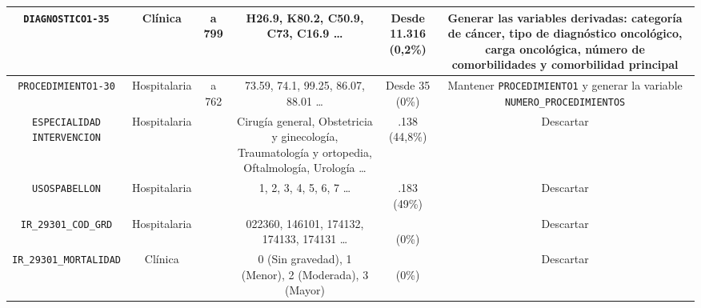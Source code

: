 \begin{table}[htbp]
\begin{tabular}{|c|c|c|c|c|c|}
\parbox[t]{2.6cm}{\raggedright \texttt{DIAGNOSTICO1-35}} &
\parbox[t]{1.5cm}{\centering Clínica} &
\parbox[t]{1cm}{ a 799} &
\parbox[t]{4.4cm}{\raggedright H26.9, K80.2, C50.9, C73, C16.9 \ldots} &
\parbox[t]{1.4cm}{\centering Desde 11.316\\(0,2\%)} &
\parbox[t]{3cm}{\raggedright Generar las variables derivadas: categoría de cáncer, tipo de diagnóstico oncológico, carga oncológica, número de comorbilidades y comorbilidad principal} \\ \hline

\parbox[t]{2.6cm}{\raggedright \texttt{PROCEDIMIENTO1-30}} &
\parbox[t]{1.5cm}{\centering Hospitalaria} &
\parbox[t]{1cm}{ a 762} &
\parbox[t]{4.4cm}{\raggedright 73.59, 74.1, 99.25, 86.07, 88.01 \ldots} &
\parbox[t]{1.4cm}{\centering Desde 35\\(0\%)} &
\parbox[t]{3cm}{\raggedright Mantener \texttt{PROCEDIMIENTO1} y generar la variable \texttt{NUMERO\_PROCEDIMIENTOS}} \\ \hline

\parbox[t]{2.6cm}{\raggedright \texttt{ESPECIALIDAD\\INTERVENCION}} &
\parbox[t]{1.5cm}{\centering Hospitalaria} &
\parbox[t]{1cm}{} &
\parbox[t]{4.4cm}{\raggedright Cirugía general, Obstetricia y ginecología, Traumatología y ortopedia, Oftalmología, Urología \ldots} &
\parbox[t]{1.4cm}{.138\\(44,8\%)} &
\parbox[t]{3cm}{\raggedright Descartar} \\ \hline

\parbox[t]{2.6cm}{\raggedright \texttt{USOSPABELLON}} &
\parbox[t]{1.5cm}{\centering Hospitalaria} &
\parbox[t]{1cm}{} &
\parbox[t]{4.4cm}{\raggedright 1, 2, 3, 4, 5, 6, 7 \ldots} &
\parbox[t]{1.4cm}{.183\\(49\%)} &
\parbox[t]{3cm}{\raggedright Descartar} \\ \hline

\parbox[t]{2.6cm}{\raggedright \texttt{IR\_29301\_COD\_GRD}} &
\parbox[t]{1.5cm}{\centering Hospitalaria} &
\parbox[t]{1cm}{} &
\parbox[t]{4.4cm}{\raggedright 022360, 146101, 174132, 174133, 174131 \ldots} &
\parbox[t]{1.4cm}{\\(0\%)} &
\parbox[t]{3cm}{\raggedright Descartar} \\ \hline

\parbox[t]{2.6cm}{\raggedright \texttt{IR\_29301\_MORTALIDAD}} &
\parbox[t]{1.5cm}{\centering Clínica} &
\parbox[t]{1cm}{} &
\parbox[t]{4.4cm}{\raggedright 0 (Sin gravedad), 1 (Menor), 2 (Moderada), 3 (Mayor)} &
\parbox[t]{1.4cm}{\\(0\%)} &
\parbox[t]{3cm}{\raggedright Descartar} \\ \hline


\end{tabular}
\end{table}
